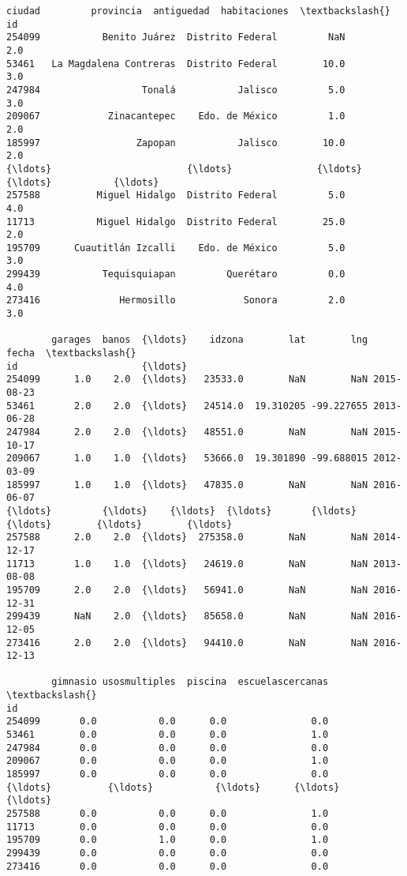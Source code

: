 \documentclass[11pt]{article}
\begin{document}
\begin{tcolorbox}[breakable, boxrule=.5pt, size=fbox, pad at break*=1mm, opacityfill=0]
\begin{Verbatim}[commandchars=\\\{\}]
                        ciudad         provincia  antiguedad  habitaciones  \textbackslash{}
id
254099           Benito Juárez  Distrito Federal         NaN           2.0
53461   La Magdalena Contreras  Distrito Federal        10.0           3.0
247984                  Tonalá           Jalisco         5.0           3.0
209067            Zinacantepec    Edo. de México         1.0           2.0
185997                 Zapopan           Jalisco        10.0           2.0
{\ldots}                        {\ldots}               {\ldots}         {\ldots}           {\ldots}
257588          Miguel Hidalgo  Distrito Federal         5.0           4.0
11713           Miguel Hidalgo  Distrito Federal        25.0           2.0
195709      Cuautitlán Izcalli    Edo. de México         5.0           3.0
299439           Tequisquiapan         Querétaro         0.0           4.0
273416              Hermosillo            Sonora         2.0           3.0

        garages  banos  {\ldots}    idzona        lat        lng      fecha  \textbackslash{}
id                      {\ldots}
254099      1.0    2.0  {\ldots}   23533.0        NaN        NaN 2015-08-23
53461       2.0    2.0  {\ldots}   24514.0  19.310205 -99.227655 2013-06-28
247984      2.0    2.0  {\ldots}   48551.0        NaN        NaN 2015-10-17
209067      1.0    1.0  {\ldots}   53666.0  19.301890 -99.688015 2012-03-09
185997      1.0    1.0  {\ldots}   47835.0        NaN        NaN 2016-06-07
{\ldots}         {\ldots}    {\ldots}  {\ldots}       {\ldots}        {\ldots}        {\ldots}        {\ldots}
257588      2.0    2.0  {\ldots}  275358.0        NaN        NaN 2014-12-17
11713       1.0    1.0  {\ldots}   24619.0        NaN        NaN 2013-08-08
195709      2.0    2.0  {\ldots}   56941.0        NaN        NaN 2016-12-31
299439      NaN    2.0  {\ldots}   85658.0        NaN        NaN 2016-12-05
273416      2.0    2.0  {\ldots}   94410.0        NaN        NaN 2016-12-13

        gimnasio usosmultiples  piscina  escuelascercanas  \textbackslash{}
id
254099       0.0           0.0      0.0               0.0
53461        0.0           0.0      0.0               1.0
247984       0.0           0.0      0.0               0.0
209067       0.0           0.0      0.0               1.0
185997       0.0           0.0      0.0               0.0
{\ldots}          {\ldots}           {\ldots}      {\ldots}               {\ldots}
257588       0.0           0.0      0.0               1.0
11713        0.0           0.0      0.0               0.0
195709       0.0           1.0      0.0               1.0
299439       0.0           0.0      0.0               0.0
273416       0.0           0.0      0.0               0.0


\end{Verbatim}
\end{tcolorbox}
\end{document}
